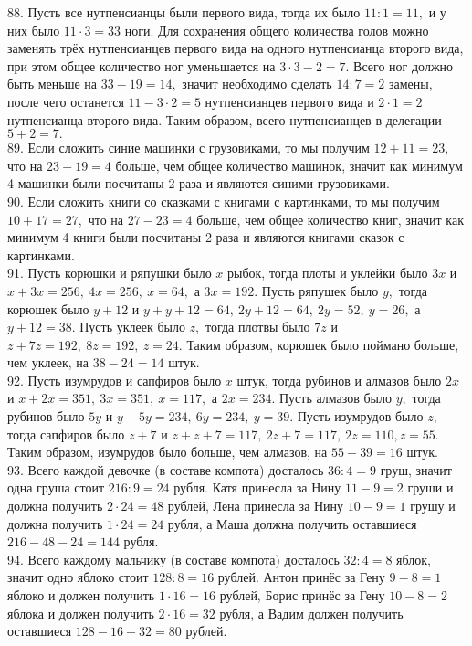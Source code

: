 88. Пусть все нутпенсианцы были первого вида, тогда их было $11:1=11,$ и у них было $11\cdot3=33$ ноги. Для сохранения общего количества голов можно заменять трёх нутпенсианцев первого вида на одного нутпенсианца второго вида, при этом общее количество ног уменьшается на $3\cdot3-2=7.$ Всего ног должно быть меньше на  $33-19=14,$ значит необходимо сделать $14:7=2$ замены, после чего останется $11-3\cdot2=5$ нутпенсианцев первого вида и $2\cdot1=2$ нутпенсианца второго вида. Таким образом, всего нутпенсианцев в делегации $5+2=7.$\\
89. Если сложить синие машинки с грузовиками, то мы получим $12+11=23,$ что на $23-19=4$ больше, чем общее количество машинок, значит как минимум 4 машинки были посчитаны 2 раза и являются синими грузовиками.\\
90. Если сложить книги со сказками с книгами с картинками, то мы получим $10+17=27,$ что на $27-23=4$ больше, чем общее количество книг, значит как минимум 4 книги были посчитаны 2 раза и являются книгами сказок с картинками.\\
91. Пусть корюшки и ряпушки было $x$ рыбок, тогда плоты и уклейки было $3x$ и $x+3x=256,\ 4x=256,\ x=64,$ а $3x=192.$ Пусть ряпушек было $y,$ тогда корюшек было $y+12$ и $y+y+12=64,\ 2y+12=64,\ 2y=52,\ y=26,$ а $y+12=38.$ Пусть уклеек было $z,$ тогда плотвы было $7z$ и $z+7z=192,\ 8z=192,\ z=24.$ Таким образом, корюшек было поймано больше, чем уклеек, на $38-24=14$ штук.\\
92. Пусть изумрудов и сапфиров было $x$ штук, тогда рубинов и алмазов было $2x$ и $x+2x=351,\ 3x=351,\ x=117,$ а $2x=234.$ Пусть алмазов было $y,$ тогда рубинов было $5y$ и $y+5y=234,\ 6y=234,\ y=39.$ Пусть изумрудов было $z,$ тогда сапфиров было $z+7$ и $z+z+7=117,\ 2z+7=117,\ 2z=110, z=55.$ Таким образом, изумрудов было больше, чем алмазов, на $55-39=16$ штук.\\
93. Всего каждой девочке (в составе компота) досталось $36:4=9$ груш, значит одна груша стоит $216:9=24$ рубля. Катя принесла за Нину $11-9=2$ груши и должна получить $2\cdot24=48$ рублей, Лена принесла за Нину $10-9=1$ грушу и должна получить $1\cdot24=24$ рубля, а Маша должна получить оставшиеся $216-48-24=144$ рубля.\\
94. Всего каждому мальчику (в составе компота) досталось $32:4=8$ яблок, значит одно яблоко стоит $128:8=16$ рублей. Антон принёс за Гену $9-8=1$ яблоко и должен получить $1\cdot16=16$ рублей, Борис принёс за Гену $10-8=2$ яблока и должен получить $2\cdot16=32$ рубля, а Вадим должен получить оставшиеся $128-16-32=80$ рублей.\\
